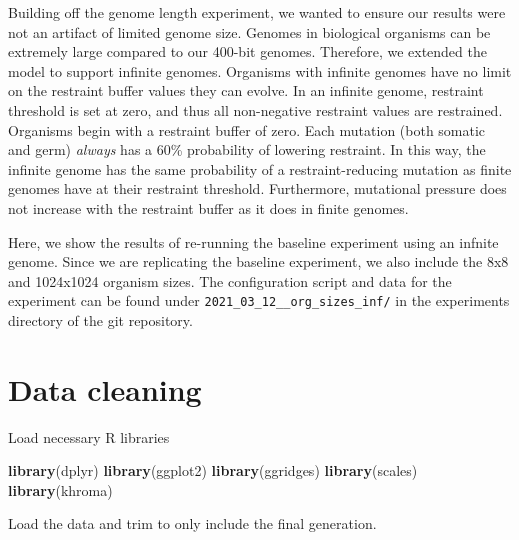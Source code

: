 \documentclass[]{book}
\newenvironment{Shaded}{\begin{snugshade}}{\end{snugshade}}
\newcommand{\CommentTok}[1]{\textcolor[rgb]{0.56,0.35,0.01}{\textit{#1}}}
\newcommand{\DecValTok}[1]{\textcolor[rgb]{0.00,0.00,0.81}{#1}}
\newcommand{\KeywordTok}[1]{\textcolor[rgb]{0.13,0.29,0.53}{\textbf{#1}}}
\newcommand{\NormalTok}[1]{#1}
\newcommand{\OperatorTok}[1]{\textcolor[rgb]{0.81,0.36,0.00}{\textbf{#1}}}
\newcommand{\StringTok}[1]{\textcolor[rgb]{0.31,0.60,0.02}{#1}}
\begin{document}
Building off the genome length experiment, we wanted to ensure our results were not an artifact of limited genome size.
Genomes in biological organisms can be extremely large compared to our 400-bit genomes.
Therefore, we extended the model to support infinite genomes.
Organisms with infinite genomes have no limit on the restraint buffer values they can evolve.
In an infinite genome, restraint threshold is set at zero, and thus all non-negative restraint values are restrained.
Organisms begin with a restraint buffer of zero.
Each mutation (both somatic and germ) \emph{always} has a 60\% probability of lowering restraint.
In this way, the infinite genome has the same probability of a restraint-reducing mutation as finite genomes have at their restraint threshold.
Furthermore, mutational pressure does not increase with the restraint buffer as it does in finite genomes.

Here, we show the results of re-running the baseline experiment using an infnite genome.
Since we are replicating the baseline experiment, we also include the 8x8 and 1024x1024 organism sizes.
The configuration script and data for the experiment can be found under \texttt{2021\_03\_12\_\_org\_sizes\_inf/} in the experiments directory of the git repository.

\hypertarget{data-cleaning-6}{%
\section{Data cleaning}\label{data-cleaning-6}}

Load necessary R libraries

\begin{Shaded}
\begin{Highlighting}[]
\KeywordTok{library}\NormalTok{(dplyr)}
\KeywordTok{library}\NormalTok{(ggplot2)}
\KeywordTok{library}\NormalTok{(ggridges)}
\KeywordTok{library}\NormalTok{(scales)}
\KeywordTok{library}\NormalTok{(khroma)}
\end{Highlighting}
\end{Shaded}

Load the data and trim to only include the final generation.

\begin{Shaded}
\end{Shaded}
\end{document}
